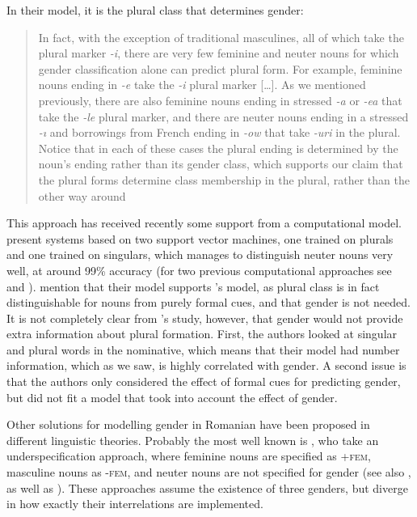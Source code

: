 In their model, it is the plural class that determines gender:

\begin{quotation}
  In fact, with the exception of traditional masculines, all of which take the plural marker \textit{-i}, there are very few feminine and neuter nouns for which gender classification alone can predict plural form. For example, feminine nouns ending in \textit{-e} take the \textit{-i} plural marker [\dots]. As we mentioned previously, there are also feminine nouns ending in stressed \textit{-a} or \textit{-ea} that take the \textit{-le} plural marker, and there are neuter nouns ending in a stressed \textit{-ı} and borrowings from French ending in \textit{-ow} that take \textit{-uri} in the plural. Notice that in each of these cases the plural ending is determined by the noun’s ending rather than its gender class, which supports our claim that the plural forms determine class membership in the plural, rather than the other way around \autocite[p. 54]{Bateman.2010}
\end{quotation}

This approach has received recently some support from a computational model. \textcite{Dinu.2012} present systems based on two support vector machines, one trained on plurals and one trained on singulars, which manages to distinguish neuter nouns very well, at around 99\% accuracy (for two previous computational approaches see \textcite{Cucerzan.2003} and \textcite{Nastase.2009}). \textcite[p. 123]{Dinu.2012} mention that their model supports \textcite{Bateman.2010}'s model, as plural class is in fact distinguishable for nouns from purely formal cues, and that gender is not needed. It is not completely clear from \textcite{Dinu.2012}'s study, however, that gender would not provide extra information about plural formation. First, the authors looked at singular and plural words in the nominative, which means that their model had number information, which as we saw, is highly correlated with gender. A second issue is that the authors only considered the effect of formal cues for predicting gender, but did not fit a model that took into account the effect of gender.

Other solutions for modelling gender in Romanian have been proposed in different linguistic theories. Probably the most well known is \textcite{Farkas.1995}, who take an underspecification approach, where feminine nouns are specified as +\textsc{fem}, masculine nouns as -\textsc{fem}, and neuter nouns are not specified for gender (see also \textcite{Farkas.1990}, as well as \textcites{Sadler.2006, Wechsler.2008, Kramer.2015}). These approaches assume the existence of three genders, but diverge in how exactly their interrelations are implemented.


